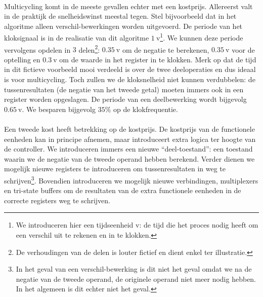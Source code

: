 \paragraph{}
Multicycling komt in de meeste gevallen echter met een kostprijs. Allereerst valt in de praktijk de snelheidswinst meestal tegen. Stel bijvoorbeeld dat in het algoritme alleen verschil-bewerkingen worden uitgevoerd. De periode van het kloksignaal is in de realisatie van dit algoritme $1~\mbox{v}$\footnote{We introduceren hier een tijdseenheid \mbox{v}: de tijd die het proces nodig heeft om een verschil uit te rekenen en in te klokken.}. We kunnen deze periode vervolgens opdelen in $3$ delen\footnote{De verhoudingen van de delen is louter fictief en dient enkel ter illustratie.}: $0.35~\mbox{v}$ om de negatie te berekenen, $0.35~\mbox{v}$ voor de optelling en $0.3~\mbox{v}$ om de waarde in het register in te klokken. Merk op dat de tijd in dit fictieve voorbeeld mooi verdeeld is over de twee deeloperaties en dus ideaal is voor multicycling. Toch zullen we de kloksnelheid niet kunnen verdubbelen: de tussenresultaten (de negatie van het tweede getal) moeten immers ook in een register worden opgeslagen. De periode van een deelbewerking wordt bijgevolg $0.65~\mbox{v}$. We besparen bijgevolg $35\%$ op de klokfrequentie.
\paragraph{}
Een tweede kost heeft betrekking op de kostprijs. De kostprijs van de functionele eenheden kan in principe afnemen, maar introduceert extra logica ter hoogte van de controller. We introduceren immers een nieuwe ``deel-toestand'': een toestand waarin we de negatie van de tweede operand hebben berekend. Verder dienen we mogelijk nieuwe registers te introduceren om tussenresultaten in weg te schrijven\footnote{In het geval van een verschil-bewerking is dit niet het geval omdat we na de negatie van de tweede operand, de originele operand niet meer nodig hebben. In het algemeen is dit echter niet het geval.}. Bovendien introduceren we mogelijk nieuwe verbindingen, multiplexers en tri-state buffers om de resultaten van de extra functionele eenheden in de correcte registers weg te schrijven.
